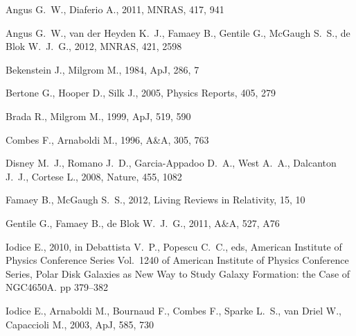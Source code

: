 \documentclass[useAMS,usenatbib]{mn2e}
\newcommand{\mnras}{MNRAS}
\newcommand{\apj}{ApJ}
\newcommand{\aap}{A\&A}
\newcommand{\nat}{Nature}
\newcommand{\physrep}{Physics Reports}
\begin{document}
\begin{thebibliography}{}

{Angus} G.~W.,  {Diaferio} A.,  2011, \mnras, 417, 941

{Angus} G.~W.,  {van der Heyden} K.~J.,  {Famaey} B.,  {Gentile} G.,  {McGaugh}
  S.~S.,    {de Blok} W.~J.~G.,  2012, \mnras, 421, 2598

{Bekenstein} J.,  {Milgrom} M.,  1984, \apj, 286, 7

{Bertone} G.,  {Hooper} D.,    {Silk} J.,  2005, \physrep, 405, 279

{Brada} R.,  {Milgrom} M.,  1999, \apj, 519, 590

{Combes} F.,  {Arnaboldi} M.,  1996, \aap, 305, 763

{Disney} M.~J.,  {Romano} J.~D.,  {Garcia-Appadoo} D.~A.,  {West} A.~A.,
  {Dalcanton} J.~J.,    {Cortese} L.,  2008, \nat, 455, 1082

{Famaey} B.,  {McGaugh} S.~S.,  2012, Living Reviews in Relativity, 15, 10

{Gentile} G.,  {Famaey} B.,    {de Blok} W.~J.~G.,  2011, \aap, 527, A76

{Iodice} E.,  2010, in {Debattista} V.~P.,  {Popescu} C.~C.,  eds, American
  Institute of Physics Conference Series Vol.~1240 of American Institute of
  Physics Conference Series, {Polar Disk Galaxies as New Way to Study Galaxy
  Formation: the Case of NGC4650A}.
pp 379--382

{Iodice} E.,  {Arnaboldi} M.,  {Bournaud} F.,  {Combes} F.,  {Sparke} L.~S.,
  {van Driel} W.,    {Capaccioli} M.,  2003, \apj, 585, 730


\end{thebibliography}
\end{document}
